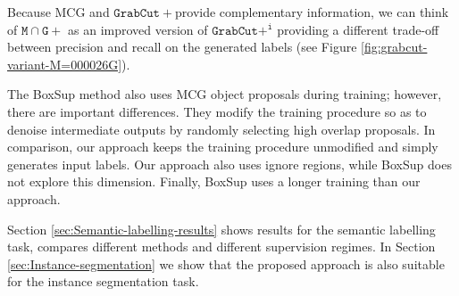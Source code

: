 \documentclass[10pt,english,british,twocolumn]{article}
\begin{document}
Because MCG and $\mathtt{GrabCut+}$provide complementary information,
we can think of $\mathtt{M}\cap\mathtt{G+}$ as an improved version
of $\mathtt{GrabCut+^{i}}$ providing a different trade-off between
precision and recall on the generated labels (see Figure \ref{fig:grabcut-variant-M=000026G}). 

The BoxSup method \cite{Dai2015Iccv} also uses MCG object proposals
during training; however, there are important differences. They modify
the training procedure so as to denoise intermediate outputs by randomly
selecting high overlap proposals. In comparison, our approach keeps
the training procedure unmodified and simply generates input labels.
Our approach also uses ignore regions, while BoxSup does not explore
this dimension. Finally, BoxSup uses a longer training than our approach.

Section \ref{sec:Semantic-labelling-results} shows results for the
semantic labelling task, compares different methods and different
supervision regimes. In Section \ref{sec:Instance-segmentation} we
show that the proposed approach is also suitable for the instance
segmentation task. 
\end{document}
